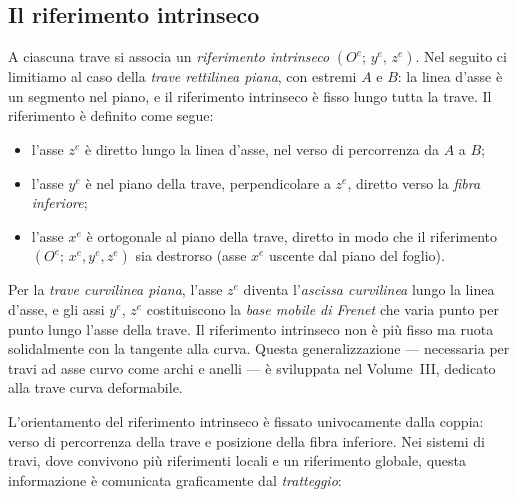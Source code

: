 \subsection{Il riferimento intrinseco}
\label{sec:riferimento_intrinseco}

A ciascuna trave si associa un \emph{riferimento
	intrinseco} $(O^e;\, y^e,\, z^e)$. Nel seguito ci
limitiamo al caso della \emph{trave rettilinea piana},
con estremi $A$ e $B$: la linea d'asse è un segmento
nel piano, e il riferimento intrinseco è fisso lungo
tutta la trave. Il riferimento è definito come segue:

\begin{itemize}[nosep]
	\item l'asse $z^e$ è diretto lungo la linea d'asse,
	nel verso di percorrenza da $A$ a $B$;
	\item l'asse $y^e$ è nel piano della trave,
	perpendicolare a $z^e$, diretto verso la
	\emph{fibra inferiore};
	\item l'asse $x^e$ è ortogonale al piano della
	trave, diretto in modo che il riferimento
	$(O^e;\, x^e, y^e, z^e)$ sia destrorso
	(asse $x^e$ uscente dal piano del foglio).
\end{itemize}

\begin{oss}
	Per la \emph{trave curvilinea piana}, l'asse $z^e$
	diventa l'\emph{ascissa curvilinea} lungo la linea
	d'asse, e gli assi $y^e$, $z^e$ costituiscono la
	\emph{base mobile di Frenet} che varia punto per
	punto lungo l'asse della trave. Il riferimento
	intrinseco non è più fisso ma ruota solidalmente
	con la tangente alla curva. Questa generalizzazione
	--- necessaria per travi ad asse curvo come archi
	e anelli --- è sviluppata nel Volume~III, dedicato
	alla trave curva deformabile.
\end{oss}


L'orientamento del riferimento intrinseco è fissato
univocamente dalla coppia: verso di percorrenza della
trave e posizione della fibra inferiore. Nei sistemi
di travi, dove convivono più riferimenti locali e
un riferimento globale, questa informazione è
comunicata graficamente dal \emph{tratteggio}:

